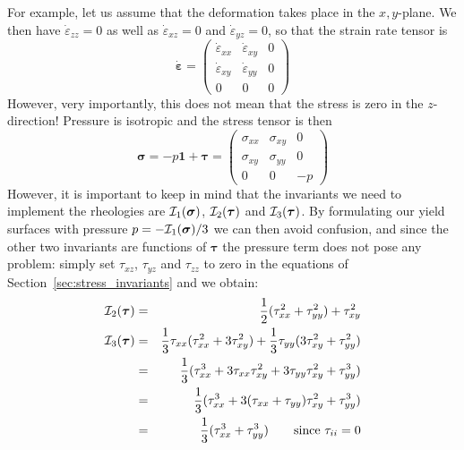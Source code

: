 For example, let us assume that the deformation takes place in the $x,y$-plane. 
We then have $\dot{\varepsilon}_{zz}=0$ as well as $\dot{\varepsilon}_{xz}=0$ and $\dot{\varepsilon}_{yz}=0$, so
that the strain rate tensor is 
\[
\dot{\bm \varepsilon}=
\left( \begin{array}{ccc}
\dot{\varepsilon}_{xx} & \dot{\varepsilon}_{xy} & 0 \\
\dot{\varepsilon}_{xy} & \dot{\varepsilon}_{yy} & 0 \\
0 & 0 & 0
\end{array}\right)
\]
However, very importantly, this does not mean that the stress is zero in the $z$-direction! Pressure is 
isotropic and the stress tensor is then 
\[
{\bm \sigma}=
-p {\bm 1} + {\bm \tau} =
\left( \begin{array}{ccc}
{\sigma}_{xx} & {\sigma}_{xy} & 0 \\
{\sigma}_{xy} & {\sigma}_{yy} & 0 \\
0 & 0 & -p
\end{array}\right)
\]
However, it is important to keep in mind that the invariants we need to implement 
the rheologies are ${\cal I}_1({\bm \sigma})$,  ${\cal I}_2({\bm \tau})$ and ${\cal I}_3({\bm \tau})$.
By formulating our yield surfaces with pressure $p=-{\cal I}_1({\bm \sigma})/3$ we can then 
avoid confusion, and since the other two invariants are functions of ${\bm \tau}$ the pressure 
term does not pose any problem: simply set $\tau_{xz}$, $\tau_{yz}$ and $\tau_{zz}$ to zero in the 
equations of Section~\ref{sec:stress_invariants} and we obtain:
\begin{eqnarray}
{\cal I}_2({\bm \tau}) &=&\frac{1}{2}(\tau_{xx}^2 + \tau_{yy}^2 ) + \tau_{xy}^2 \\ 
{\cal I}_3({\bm \tau}) 
&=& \frac{1}{3} \tau_{xx} (  \tau_{xx}^2 + 3 \tau_{xy}^2 ) 
+ \frac{1}{3} \tau_{yy} (3 \tau_{xy}^2 +   \tau_{yy}^2 )   \nonumber\\
&=& \frac{1}{3}(  \tau_{xx}^3 + 3 \tau_{xx}\tau_{xy}^2  
+ 3 \tau_{yy} \tau_{xy}^2 +   \tau_{yy}^3 )   \nonumber\\
&=& \frac{1}{3}(  \tau_{xx}^3 + 3 (\tau_{xx}+\tau_{yy}) \tau_{xy}^2  +  \tau_{yy}^3 )   \nonumber\\
&=& \frac{1}{3}(  \tau_{xx}^3 +  \tau_{yy}^3 )  \qquad \text{since } \tau_{ii}=0 
\end{eqnarray}





